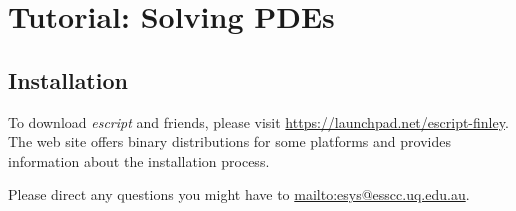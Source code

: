
%
%
%


\chapter{Tutorial: Solving PDEs}
\label{CHAP: Tutorial}

\section{Installation}
\label{INSTALL}
To download {\it escript} and friends, please visit \url{https://launchpad.net/escript-finley}. 
The web site offers binary distributions for some platforms and provides information about the installation process.

Please direct any questions you might have to \url{mailto:esys@esscc.uq.edu.au}.






% 

